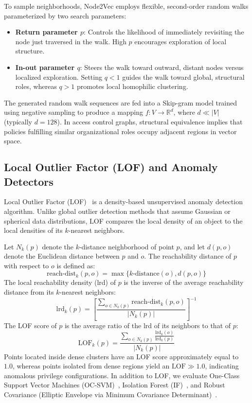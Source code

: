 To sample neighborhoods, Node2Vec employs flexible, second-order random walks parameterized by two search parameters:
\begin{itemize}
    \item \textbf{Return parameter $p$}: Controls the likelihood of immediately revisiting the node just traversed in the walk. High $p$ encourages exploration of local structure.
    \item \textbf{In-out parameter $q$}: Steers the walk toward outward, distant nodes versus localized exploration. Setting $q < 1$ guides the walk toward global, structural roles, whereas $q > 1$ promotes local homophilic clustering.
\end{itemize}
The generated random walk sequences are fed into a Skip-gram model trained using negative sampling to produce a mapping $f: V \to \mathbb{R}^d$, where $d \ll |V|$ (typically $d = 128$). In access control graphs, structural equivalence implies that policies fulfilling similar organizational roles occupy adjacent regions in vector space.

\subsection{Local Outlier Factor (LOF) and Anomaly Detectors}
Local Outlier Factor (LOF)~\cite{breunig2000lof} is a density-based unsupervised anomaly detection algorithm. Unlike global outlier detection methods that assume Gaussian or spherical data distributions, LOF compares the local density of an object to the local densities of its $k$-nearest neighbors.

Let $N_k(p)$ denote the $k$-distance neighborhood of point $p$, and let $d(p, o)$ denote the Euclidean distance between $p$ and $o$. The reachability distance of $p$ with respect to $o$ is defined as:
\begin{equation}
\text{reach-dist}_k(p, o) = \max\{k\text{-distance}(o), d(p, o)\}
\end{equation}
The local reachability density (lrd) of $p$ is the inverse of the average reachability distance from its $k$-nearest neighbors:
\begin{equation}
\text{lrd}_k(p) = \left[ \frac{\sum_{o \in N_k(p)} \text{reach-dist}_k(p, o)}{|N_k(p)|} \right]^{-1}
\end{equation}
The LOF score of $p$ is the average ratio of the lrd of its neighbors to that of $p$:
\begin{equation}
\text{LOF}_k(p) = \frac{\sum_{o \in N_k(p)} \frac{\text{lrd}_k(o)}{\text{lrd}_k(p)}}{|N_k(p)|}
\end{equation}
Points located inside dense clusters have an LOF score approximately equal to $1.0$, whereas points isolated from dense regions yield an $\text{LOF} \gg 1.0$, indicating anomalous privilege configurations. In addition to LOF, we evaluate One-Class Support Vector Machines (OC-SVM)~\cite{scholkopf2001estimating}, Isolation Forest (IF)~\cite{liu2008isolation}, and Robust Covariance (Elliptic Envelope via Minimum Covariance Determinant)~\cite{rousseeuw1999fast}.

